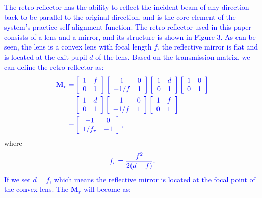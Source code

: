 \documentclass{IEEEtran}
\begin{document}
\textcolor{blue}{The retro-reflector has the ability to reflect the incident beam of any direction back to be parallel to the original direction, and is the core element of the system's practice self-alignment function. The retro-reflector used in this paper consists of a lens and a mirror, and its structure is shown in Figure 3. As can be seen, the lens is a convex lens with focal length $f$, the reflective mirror is flat and is located at the exit pupil $d$ of the lens. Based on the transmission matrix, we can 
define the retro-reflector as:
}
\begin{equation}
\textcolor{blue}{
\begin{aligned}
\mathbf{M}_r=&
\left[\begin{array}{ll}
1 & f \\
0 & 1
\end{array}\right]
\left[\begin{array}{cc}
1 & 0 \\
-1 / f & 1
\end{array}\right]
\left[\begin{array}{ll}
1 & d \\
0 & 1
\end{array}\right]
\left[\begin{array}{ll}
1 & 0 \\
0 & 1
\end{array}\right]\\
&\left[\begin{array}{ll}
1 & d \\
0 & 1
\end{array}\right]\left[\begin{array}{cc}
1 & 0 \\
-1 / f & 1
\end{array}\right]\left[\begin{array}{ll}
1 & f \\
0 & 1
\end{array}\right]\\
=&\left[\begin{array}{cc}
-1 & 0 \\
1/f_r & -1
\end{array}\right],
\end{aligned}
}
\end{equation}
where 
\begin{equation}
\textcolor{blue}{
f_r=\frac{f^2}{2(d-f)}.}
\end{equation}
\textcolor{blue}{If we set $d=f$, which means the reflective mirror is located at the focal point of the convex lens. The $\mathbf{M}_r$ will become as:}
\end{document}
